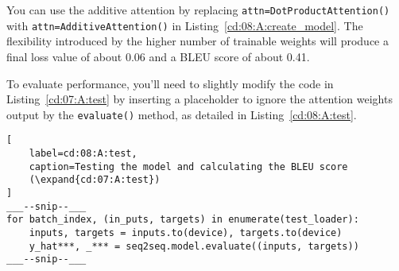 You can use the additive attention by replacing \lstinline{attn=DotProductAttention()} with \lstinline{attn=AdditiveAttention()} in Listing~\ref{cd:08:A:create_model}. The flexibility introduced by the higher number of trainable weights will produce a final loss value of about 0.06 and a BLEU score of about 0.41.


To evaluate performance, you'll need to slightly modify the code in Listing~\ref{cd:07:A:test} by inserting a placeholder to ignore the attention weights output by the \lstinline{evaluate()} method, as detailed in Listing~\ref{cd:08:A:test}.
\begin{lstlisting}[
    label=cd:08:A:test,
    caption=Testing the model and calculating the BLEU score
    (\expand{cd:07:A:test})
]
___--snip--___
for batch_index, (in_puts, targets) in enumerate(test_loader):
    inputs, targets = inputs.to(device), targets.to(device)
    y_hat***, _*** = seq2seq.model.evaluate((inputs, targets))  
___--snip--___
\end{lstlisting}

